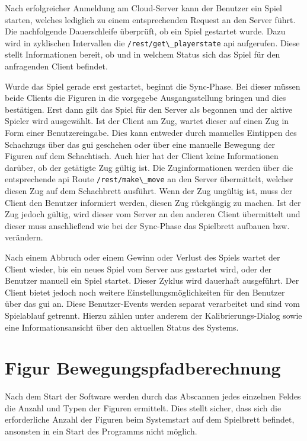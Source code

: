 Nach erfolgreicher Anmeldung am Cloud-Server kann der Benutzer ein Spiel
starten, welches lediglich zu einem entsprechenden Request an den Server
führt. Die nachfolgende Dauerschleife überprüft, ob ein Spiel gestartet
wurde. Dazu wird in zyklischen Intervallen die
\passthrough{\lstinline!/rest/get\_playerstate!} \gls{api} aufgerufen.
Diese stellt Informationen bereit, ob und in welchem Status sich das
Spiel für den anfragenden Client befindet.

Wurde das Spiel gerade erst gestartet, beginnt die Sync-Phase. Bei
dieser müssen beide Clients die Figuren in die vorgegebe
Ausgangsstellung bringen und dies bestätigen. Erst dann gilt das Spiel
für den Server als begonnen und der aktive Spieler wird ausgewählt. Ist
der Client am Zug, wartet dieser auf einen Zug in Form einer
Benutzereingabe. Dies kann entweder durch manuelles Eintippen des
Schachzugs über das \gls{gui} geschehen oder über eine manuelle Bewegung
der Figuren auf dem Schachtisch. Auch hier hat der Client keine
Informationen darüber, ob der getätigte Zug gültig ist. Die
Zuginformationen werden über die entsprechende \gls{api} Route
\passthrough{\lstinline!/rest/make\_move!} an den Server übermittelt,
welcher diesen Zug auf dem Schachbrett ausführt. Wenn der Zug ungültig
ist, muss der Client den Benutzer informiert werden, diesen Zug
rückgängig zu machen. Ist der Zug jedoch gültig, wird dieser vom Server
an den anderen Client übermittelt und dieser muss anschließend wie bei
der Sync-Phase das Spielbrett aufbauen bzw. verändern.

Nach einem Abbruch oder einem Gewinn oder Verlust des Spiels wartet der
Client wieder, bis ein neues Spiel vom Server aus gestartet wird, oder
der Benutzer manuell ein Spiel startet. Dieser Zyklus wird dauerhaft
ausgeführt. Der Client bietet jedoch noch weitere
Einstellungsmöglichkeiten für den Benutzer über das \gls{gui} an. Diese
Benutzer-Events werden separat verarbeitet und sind vom Spielablauf
getrennt. Hierzu zählen unter anderem der Kalibrierungs-Dialog sowie
eine Informationsansicht über den aktuellen Status des Systems.

\hypertarget{figur-bewegungspfadberechnung}{%
\section{Figur
Bewegungspfadberechnung}\label{figur-bewegungspfadberechnung}}

Nach dem Start der Software werden durch das Abscannen jedes einzelnen
Feldes die Anzahl und Typen der Figuren ermittelt. Dies stellt sicher,
dass sich die erforderliche Anzahl der Figuren beim Systemstart auf dem
Spielbrett befindet, ansonsten in ein Start des Programms nicht möglich.

